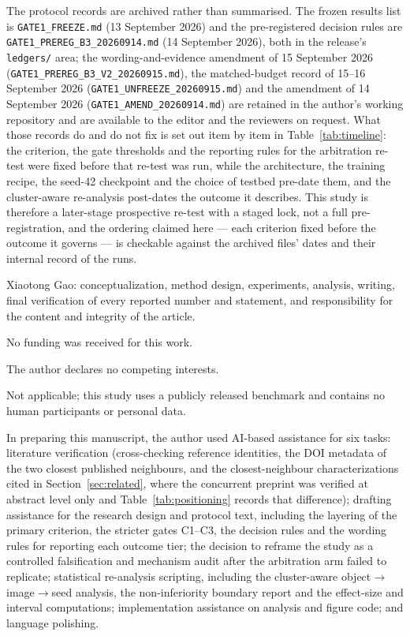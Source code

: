 \documentclass[pdflatex,sn-mathphys-num]{sn-jnl}
\theoremstyle{thmstyleone}%
\theoremstyle{thmstyletwo}%
\theoremstyle{thmstylethree}%
\begin{document}
The protocol records are archived rather than summarised. The frozen results list is \texttt{GATE1\_FREEZE.md} (13 September 2026) and the pre-registered decision rules are \texttt{GATE1\_PREREG\_B3\_20260914.md} (14 September 2026), both in the release's \texttt{ledgers/} area; the wording-and-evidence amendment of 15 September 2026 (\texttt{GATE1\_PREREG\_B3\_V2\_20260915.md}), the matched-budget record of 15--16 September 2026 (\texttt{GATE1\_UNFREEZE\_20260915.md}) and the amendment of 14 September 2026 (\texttt{GATE1\_AMEND\_20260914.md}) are retained in the author's working repository and are available to the editor and the reviewers on request. What those records do and do not fix is set out item by item in Table~\ref{tab:timeline}: the criterion, the gate thresholds and the reporting rules for the arbitration re-test were fixed before that re-test was run, while the architecture, the training recipe, the seed-42 checkpoint and the choice of testbed pre-date them, and the cluster-aware re-analysis post-dates the outcome it describes. This study is therefore a later-stage prospective re-test with a staged lock, not a full pre-registration, and the ordering claimed here --- each criterion fixed before the outcome it governs --- is checkable against the archived files' dates and their internal record of the runs.

Xiaotong Gao: conceptualization, method design, experiments, analysis, writing, final verification of every reported number and statement, and responsibility for the content and integrity of the article.

No funding was received for this work.

The author declares no competing interests.

Not applicable; this study uses a publicly released benchmark and contains no human participants or personal data.

In preparing this manuscript, the author used AI-based assistance for six tasks: literature verification (cross-checking reference identities, the DOI metadata of the two closest published neighbours, and the closest-neighbour characterizations cited in Section~\ref{sec:related}, where the concurrent preprint was verified at abstract level only and Table~\ref{tab:positioning} records that difference); drafting assistance for the research design and protocol text, including the layering of the primary criterion, the stricter gates C1--C3, the decision rules and the wording rules for reporting each outcome tier; the decision to reframe the study as a controlled falsification and mechanism audit after the arbitration arm failed to replicate; statistical re-analysis scripting, including the cluster-aware object$\to$image$\to$seed analysis, the non-inferiority boundary report and the effect-size and interval computations; implementation assistance on analysis and figure code; and language polishing.
\end{document}
